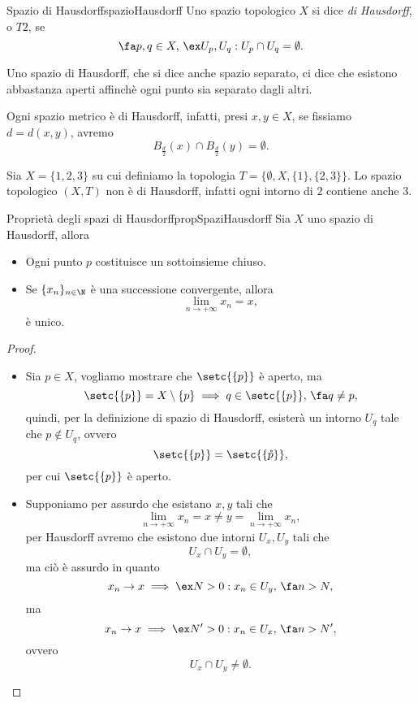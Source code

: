 \begin{defn}{Spazio di Hausdorff}{spazioHausdorff}
	Uno spazio topologico \(X\) si dice \emph{di Hausdorff}, o \(T2\), se
	\[
		\fa p,q\in X,\,\ex U_p,U_q:U_p\cap U_q=\emptyset.
	\]
\end{defn}

\begin{oss}
	Uno spazio di Hausdorff, che si dice anche spazio separato, ci dice che esistono abbastanza aperti affinchè ogni punto sia separato dagli altri.
\end{oss}

\begin{oss}
	Ogni spazio metrico è di Hausdorff, infatti, presi \(x,y\in X\), se fissiamo \(d=d(x,y)\), avremo
	\[
		B_{\frac{d}{2}}(x)\cap B_{\frac{d}{2}}(y)=\emptyset.
	\]
\end{oss}

\begin{ese}
	Sia \(X=\{1,2,3\}\) su cui definiamo la topologia \(T=\{\emptyset,X,\{1\},\{2,3\}\}\).
	Lo spazio topologico \((X,T)\) non è di Hausdorff, infatti ogni intorno di \(2\) contiene anche \(3\).
\end{ese}

\begin{prop}{Proprietà degli spazi di Hausdorff}{propSpaziHausdorff}
	Sia \(X\) uno spazio di Hausdorff, allora
	\begin{itemize}
		\item Ogni punto \(p\) costituisce un sottoinsieme chiuso.
		\item Se \(\{x_n\}_{n\in \N}\) è una successione convergente, allora
		      \[
			      \lim_{n\to +\infty}x_n=x,
		      \]
		      è unico.
	\end{itemize}
\end{prop}

\begin{proof}
	\begin{itemize}
		\item Sia \(p\in X\), vogliamo mostrare che \(\setc{\{p\}}\) è aperto, ma
		      \[
			      \setc{\{p\}}=X\setminus\{p\}\implies q\in \setc{\{p\}},\,\fa q\neq p,
		      \]
		      quindi, per la definizione di spazio di Hausdorff, esisterà un intorno \(U_q\) tale che \(p\notin U_q\), ovvero
		      \[
			      \setc{\{p\}}=\setc{\{\mathring{p}\}},
		      \]
		      per cui \(\setc{\{p\}}\) è aperto.
		\item Supponiamo per assurdo che esistano \(x,y\) tali che
		      \[
			      \lim_{n\to +\infty}x_n=x\neq y=\lim_{n\to +\infty}x_n,
		      \]
		      per Hausdorff avremo che esistono due intorni \(U_x,U_y\) tali che
		      \[
			      U_x\cap U_y=\emptyset,
		      \]
		      ma ciò è assurdo in quanto
		      \[
			      x_n\to x\implies \ex N>0:x_n\in U_y,\,\fa n>N,
		      \]
		      ma
		      \[
			      x_n\to x\implies \ex N'>0:x_n\in U_x,\,\fa n>N',
		      \]
		      ovvero
		      \[
			      U_x\cap U_y\neq \emptyset.
		      \]
	\end{itemize}
\end{proof}

